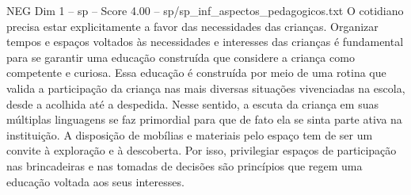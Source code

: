 \begin{textsample}{NEG Dim 1 – sp – Score 4.00 – sp/sp\_inf\_aspectos\_pedagogicos.txt}
O cotidiano precisa estar explicitamente a favor das necessidades das crianças.
Organizar tempos e espaços voltados às necessidades e interesses das crianças é fundamental para se garantir uma educação construída que considere a criança como competente e curiosa.
Essa educação é construída por meio de uma rotina que valida a participação da criança nas mais diversas situações vivenciadas na escola, desde a acolhida até a despedida.
Nesse sentido, a escuta da criança em suas múltiplas linguagens se faz primordial para que de fato ela se sinta parte ativa na instituição.
A disposição de mobílias e materiais pelo espaço tem de ser um convite à exploração e à descoberta.
Por isso, privilegiar espaços de participação nas brincadeiras e nas tomadas de decisões são princípios que regem uma educação voltada aos seus interesses.

\end{textsample}
